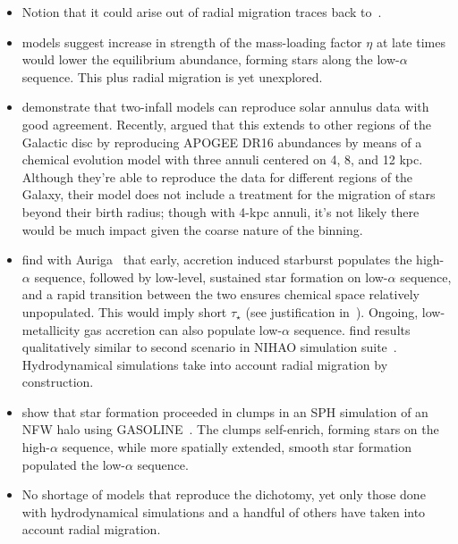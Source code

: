 \documentclass[fleqn, usenatbib]{mnras}
\begin{document}
\begin{itemize}
\begin{itemize}
		\item Notion that it could arise out of radial migration traces back 
		to~\citet{Schoenrich2009}. 

		\item \citet{Weinberg2017} models suggest increase in strength of the 
		mass-loading factor $\eta$ at late times would lower the equilibrium 
		abundance, forming stars along the low-$\alpha$ sequence. This plus 
		radial migration is yet unexplored. 

		\item \citet{Spitoni2019, Spitoni2020} demonstrate that two-infall 
		models can reproduce solar annulus data with good agreement. Recently, 
		\citet{Spitoni2021} argued that this extends to other regions of the 
		Galactic disc by reproducing APOGEE DR16 abundances by means of a 
		chemical evolution model with three annuli centered on 4, 8, and 12 
		kpc. Although they're able to reproduce the data for different regions 
		of the Galaxy, their model does not include a treatment for the 
		migration of stars beyond their birth radius; though with 4-kpc annuli, 
		it's not likely there would be much impact given the coarse nature of 
		the binning. 

		\item \citet{Grand2018} find with Auriga~\citep{Grand2017} that early, 
		accretion induced starburst populates the high-$\alpha$ sequence, 
		followed by low-level, sustained star formation on low-$\alpha$ 
		sequence, and a rapid transition between the two ensures chemical space 
		relatively unpopulated. This would imply short $\tau_\star$ (see 
		justification in~\citealp{Weinberg2017}). Ongoing, low-metallicity 
		gas accretion can also populate low-$\alpha$ sequence. 
		\citet{Buck2020b} find results qualitatively similar to second 
		scenario in NIHAO simulation suite~\citep{Wang2015, Buck2020a}. 
		Hydrodynamical simulations take into account radial migration by 
		construction. 

		\item \citet{Clarke2019} show that star formation proceeded in clumps 
		in an SPH simulation of an NFW halo using GASOLINE~\citep{NFW1997, 
		Wadsley2017}. The clumps self-enrich, forming stars on the 
		high-$\alpha$ sequence, while more spatially extended, smooth star 
		formation populated the low-$\alpha$ sequence. 

		\item No shortage of models that reproduce the dichotomy, yet only 
		those done with hydrodynamical simulations and a handful of others 
		have taken into account radial migration. 
	\end{itemize} 


\end{itemize}
\end{document}
